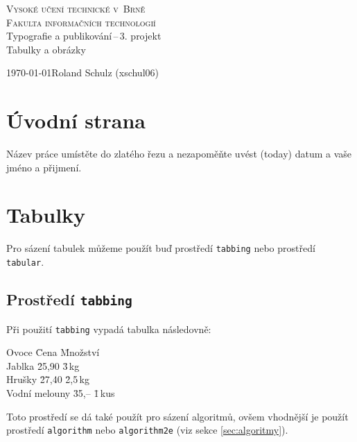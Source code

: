 \documentclass[a4paper,11pt]{article}
\begin{document}
\begin{titlepage}
    \begin{center}
        {\Huge \textsc{Vysoké učení technické v~Brně} \\[0.5em]} {\huge \textsc{Fakulta informačních technologií}} \\
        {\LARGE Typografie a publikování\,--\,3. projekt \\[0.4em] Tabulky a obrázky }\\
    \end{center}

    {\Large \today \hfill Roland Schulz (xschul06)}
    \thispagestyle{empty}
\end{titlepage}


\section{Úvodní strana}
Název práce umístěte do zlatého řezu a nezapoměňte uvést  (today) datum a vaše jméno a přijmení.

\section{Tabulky}
Pro sázení tabulek můžeme použít buď prostředí \verb|tabbing| nebo prostředí \verb|tabular|.
\subsection{Prostředí \texttt{tabbing}}
Při použití \verb|tabbing| vypadá tabulka následovně:

\begin{table}[ht]
    \begin{tabbing}
        Ovoce \= Cena \= Množství \\
        Jablka \= 25,90 \= 3\,kg \\
        Hrušky \= 27,40 \= 2,5\,kg \\ 
        Vodní melouny \= 35,-- \= 1\,kus \kill
    \end{tabbing}
\end{table}
Toto prostředí se dá také použít pro sázení algoritmů, ovšem vhodnější je použít prostředí \verb|algorithm| nebo \verb|algorithm2e| (viz sekce \ref{sec:algoritmy}).
\end{document}
